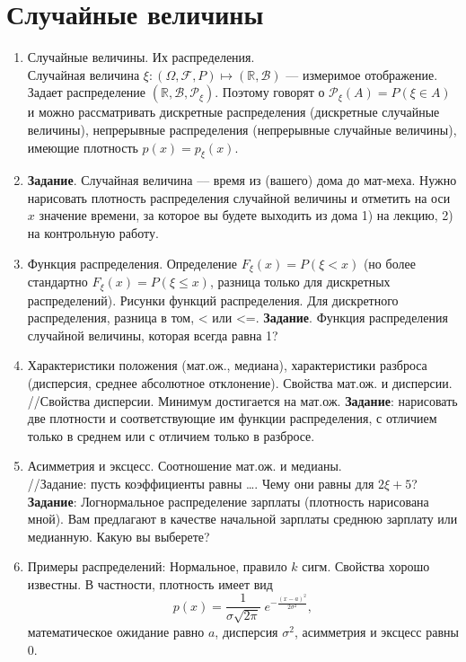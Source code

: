 \section{Случайные величины}

\begin{enumerate}
\item Случайные величины. Их распределения. \\
Случайная величина $\xi:(\Omega,\mathcal{F},P) \mapsto (\mathbb{R},\mathcal{B})$ --- измеримое отображение. Задает распределение $(\mathbb{R},\mathcal{B},\mathcal{P}_\xi)$. Поэтому говорят о $\mathcal{P}_\xi(A) =  P(\xi\in A)$ и можно рассматривать дискретные распределения (дискретные случайные величины), непрерывные распределения (непрерывные случайные величины), имеющие плотность $p(x) = p_\xi(x)$.
\item \textbf{Задание}. Случайная величина –-- время из (вашего) дома до мат-меха. Нужно нарисовать плотность распределения случайной величины и отметить на оси $x$ значение времени, за которое вы будете выходить из дома 1) на лекцию, 2) на контрольную работу.
\item Функция распределения. Определение $F_\xi(x) = P(\xi < x)$ (но более стандартно $F_\xi(x) = P(\xi \le x) $, разница только для дискретных распределений). Рисунки функций распределения.
Для дискретного распределения, разница в том, < или <=. \textbf{Задание}. Функция распределения случайной величины, которая всегда равна 1?
\item
    Характеристики положения (мат.ож., медиана), характеристики разброса (дисперсия, среднее абсолютное отклонение). Свойства мат.ож. и дисперсии.\\
//Свойства дисперсии. Минимум достигается на мат.ож.
\textbf{Задание}: нарисовать две плотности и соответствующие им функции распределения, с отличием только в среднем или с отличием только в разбросе.
\item Асимметрия и эксцесс. Соотношение мат.ож. и медианы.\\
//Задание: пусть коэффициенты равны …. Чему они равны для $2\xi + 5$?
\textbf{Задание}: Логнормальное распределение зарплаты (плотность нарисована мной). Вам предлагают в качестве начальной зарплаты среднюю зарплату или медианную. Какую вы выберете?
\item	Примеры распределений: Нормальное, правило $k$ сигм. 
Свойства хорошо известны. В частности, плотность имеет вид
\[
p(x) = \frac{1}{\sigma\sqrt{2\pi}}\; e^{ -\frac{(x-a)^2}{2\sigma^2} },
\]
математическое ожидание равно $a$, дисперсия $\sigma^2$, асимметрия и эксцесс равны 0.


\end{enumerate}
